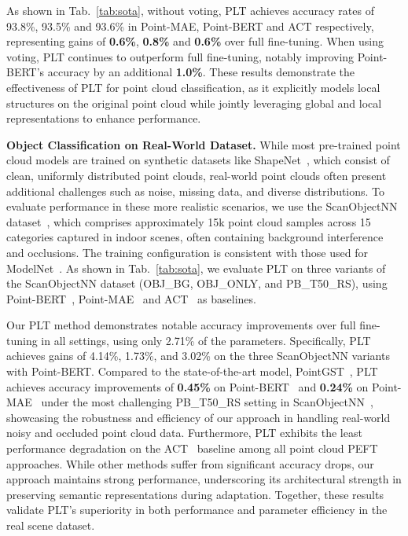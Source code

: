 As shown in Tab.~\ref{tab:sota}, without voting, PLT achieves accuracy rates of 93.8\%, 93.5\% and 93.6\% in Point-MAE, Point-BERT and ACT respectively, representing gains of \textbf{0.6\%}, \textbf{0.8\%} and \textbf{0.6\%} over full fine-tuning. When using voting, PLT continues to outperform full fine-tuning, notably improving Point-BERT's accuracy by an additional \textbf{1.0\%}. These results demonstrate the effectiveness of PLT for point cloud classification, as it explicitly models local structures on the original point cloud while jointly leveraging global and local representations to enhance performance.

\textbf{Object Classification on Real-World Dataset.} While most pre-trained point cloud models are trained on synthetic datasets like ShapeNet~\cite{chang2015shapenet}, which consist of clean, uniformly distributed point clouds, real-world point clouds often present additional challenges such as noise, missing data, and diverse distributions. To evaluate performance in these more realistic scenarios, we use the ScanObjectNN dataset~\cite{uy2019revisiting}, which comprises approximately 15k point cloud samples across 15 categories captured in indoor scenes, often containing background interference and occlusions. The training configuration is consistent with those used for ModelNet~\cite{wu20153d}. As shown in Tab.~\ref{tab:sota}, we evaluate PLT on three variants of the ScanObjectNN dataset (OBJ\_BG, OBJ\_ONLY, and PB\_T50\_RS), using Point-BERT~\cite{yu2022point},  Point-MAE~\cite{pang2022masked} and ACT~\cite{dong2022autoencoders} as baselines.

Our PLT method demonstrates notable accuracy improvements over full fine-tuning in all settings, using only 2.71\% of the parameters. 
Specifically, PLT achieves gains of 4.14\%, 1.73\%, and 3.02\% on the three ScanObjectNN variants with Point-BERT. 
Compared to the state-of-the-art model, PointGST~\cite{liang2024parameter}, PLT achieves accuracy improvements of \textbf{0.45\%} on Point-BERT~\cite{yu2022point} and \textbf{0.24\%} on Point-MAE~\cite{pang2022masked} under the most challenging PB\_T50\_RS setting in ScanObjectNN~\cite{uy2019revisiting}, showcasing the robustness and efficiency of our approach in handling real-world noisy and occluded point cloud data. 
Furthermore, PLT exhibits the least performance degradation on the ACT~\cite{dong2022autoencoders} baseline among all point cloud PEFT approaches. 
While other methods suffer from significant accuracy drops, our approach maintains strong performance, underscoring its architectural strength in preserving semantic representations during adaptation. 
Together, these results validate PLT’s superiority in both performance and parameter efficiency in the real scene dataset.

